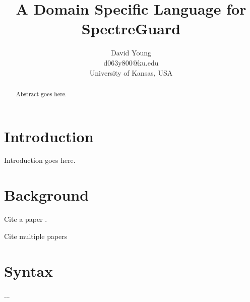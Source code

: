 \documentclass[10pt, conference]{IEEEtran}
\begin{document}
\title{A Domain Specific Language for SpectreGuard}
\author{David Young\\
d063y800@ku.edu\\
University of Kansas, USA\\
}

\maketitle
\thispagestyle{empty}
\begin{abstract}

Abstract goes here.

\end{abstract}


\section{Introduction}
Introduction goes here.

\section{Background}
Cite a paper \cite{barroso2009datacenter}.

Cite multiple papers \cite{banga99resourcecontainers,barroso2009datacenter}

\section{Syntax}
...
\end{document}
